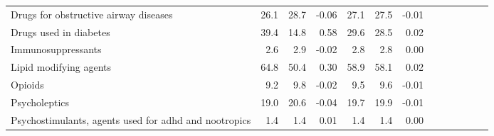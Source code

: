 \documentclass[11pt,]{article}
\begin{document}
\begin{longtable}{lrrrrrrrrrrrr}
      Drugs for obstructive airway diseases & 26.1 & 28.7 & -0.06 & 27.1 & 27.5 & -0.01 \\ 
      Drugs used in diabetes & 39.4 & 14.8 &  0.58 & 29.6 & 28.5 &  0.02 \\ 
      Immunosuppressants &  2.6 &  2.9 & -0.02 &  2.8 &  2.8 &  0.00 \\ 
      Lipid modifying agents & 64.8 & 50.4 &  0.30 & 58.9 & 58.1 &  0.02 \\ 
      Opioids &  9.2 &  9.8 & -0.02 &  9.5 &  9.6 & -0.01 \\ 
      Psycholeptics & 19.0 & 20.6 & -0.04 & 19.7 & 19.9 & -0.01 \\ 
      Psychostimulants, agents used for adhd and nootropics &  1.4 &  1.4 &  0.01 &  1.4 &  1.4 &  0.00 \\ 
   \bottomrule\end{longtable}
\clearpage
{}
\end{document}
